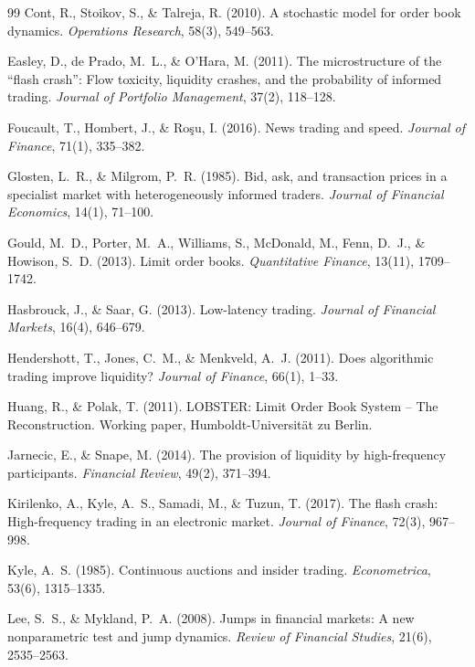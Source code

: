 \documentclass[11pt, letterpaper]{article}
\begin{document}
\begin{thebibliography}{99}
Cont, R., Stoikov, S., \& Talreja, R. (2010).
A stochastic model for order book dynamics.
\textit{Operations Research}, 58(3), 549--563.

Easley, D., de Prado, M.~L., \& O'Hara, M. (2011).
The microstructure of the ``flash crash'': Flow toxicity, liquidity crashes,
and the probability of informed trading.
\textit{Journal of Portfolio Management}, 37(2), 118--128.

Foucault, T., Hombert, J., \& Ro\c{s}u, I. (2016).
News trading and speed.
\textit{Journal of Finance}, 71(1), 335--382.

Glosten, L.~R., \& Milgrom, P.~R. (1985).
Bid, ask, and transaction prices in a specialist market with heterogeneously
informed traders.
\textit{Journal of Financial Economics}, 14(1), 71--100.

Gould, M.~D., Porter, M.~A., Williams, S., McDonald, M., Fenn, D.~J., \&
Howison, S.~D. (2013).
Limit order books.
\textit{Quantitative Finance}, 13(11), 1709--1742.

Hasbrouck, J., \& Saar, G. (2013).
Low-latency trading.
\textit{Journal of Financial Markets}, 16(4), 646--679.

Hendershott, T., Jones, C.~M., \& Menkveld, A.~J. (2011).
Does algorithmic trading improve liquidity?
\textit{Journal of Finance}, 66(1), 1--33.

Huang, R., \& Polak, T. (2011).
LOBSTER: Limit Order Book System -- The Reconstruction.
Working paper, Humboldt-Universit\"at zu Berlin.

Jarnecic, E., \& Snape, M. (2014).
The provision of liquidity by high-frequency participants.
\textit{Financial Review}, 49(2), 371--394.

Kirilenko, A., Kyle, A.~S., Samadi, M., \& Tuzun, T. (2017).
The flash crash: High-frequency trading in an electronic market.
\textit{Journal of Finance}, 72(3), 967--998.

Kyle, A.~S. (1985).
Continuous auctions and insider trading.
\textit{Econometrica}, 53(6), 1315--1335.

Lee, S.~S., \& Mykland, P.~A. (2008).
Jumps in financial markets: A new nonparametric test and jump dynamics.
\textit{Review of Financial Studies}, 21(6), 2535--2563.


\end{thebibliography}
\end{document}
